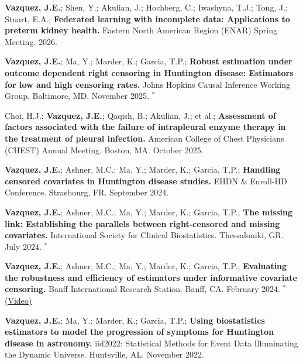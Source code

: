 \begin{cventries}
{\begin{etaremune}
    \item {\bf Vazquez, J.E.}; Shen, Y.; Akulian, J.; Hochberg, C.; Iwashyna, T.J.; Tong, J.; 
          Stuart, E.A.; \textbf{Federated learning with incomplete data: Applications to preterm 
          kidney health.} Eastern North American Region (ENAR) Spring Meeting. 2026.

    \item {\bf Vazquez, J.E.}; Ma, Y.; Marder, K.; Garcia, T.P.; \textbf{Robust estimation under 
          outcome dependent right censoring in Huntington disease: Estimators for low and high 
          censoring rates.} Johns Hopkins Causal Inference Working Group. Baltimore, MD. 
          November 2025. $^*$

    \item Choi, H.J.; {\bf Vazquez, J.E.}; Qaqish, B.; Akulian, J.; et al.; \textbf{Assessment of 
          factors associated with the failure of intrapleural enzyme therapy in the treatment of 
          pleural infection.} American College of Chest Physicians (CHEST) Annual Meeting. 
          Boston, MA. October 2025.

    \item {\bf Vazquez, J.E.}; Ashner, M.C.; Ma, Y.; Marder, K.; Garcia, T.P.; \textbf{Handling 
          censored covariates in Huntington disease studies.} EHDN \& Enroll-HD Conference. 
          Strasbourg, FR. September 2024.

    \item {\bf Vazquez, J.E.}; Ashner, M.C.; Ma, Y.; Marder, K.; Garcia, T.P.; \textbf{The missing 
          link: Establishing the parallels between right-censored and missing covariates.} 
          International Society for Clinical Biostatistics. Thessaloniki, GR. July 2024. $^*$

    \item {\bf Vazquez, J.E.}; Ashner, M.C.; Ma, Y.; Marder, K.; Garcia, T.P.; \textbf{Evaluating 
          the robustness and efficiency of estimators under informative covariate censoring.} 
          Banff International Research Station. Banff, CA. February 2024. $^*$
          \underline{\href{https://www.birs.ca/events/2024/5-day-workshops/24w5160/videos/watch/202402010930-Vazquez.html}{(Video)}}

    \item {\bf Vazquez, J.E.}; Ma, Y.; Marder, K.; Garcia, T.P.; \textbf{Using biostatistics 
          estimators to model the progression of symptoms for Huntington disease in astronomy.} 
          iid2022: Statistical Methods for Event Data Illuminating the Dynamic Universe. 
          Huntsville, AL. November 2022.


\end{etaremune}}
\end{cventries}
